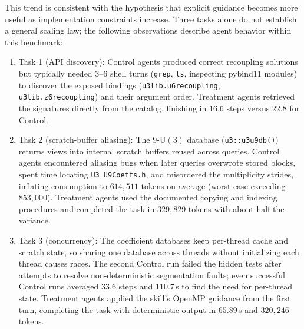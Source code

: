 \documentclass[aps,onecolumn,10pt,superscriptaddress,floatfix,nofootinbib]{revtex4}
\begin{document}
This trend is consistent with the hypothesis that explicit guidance becomes more useful as implementation constraints increase. Three tasks alone do not establish a general scaling law; the following observations describe agent behavior within this benchmark:
\begin{enumerate}
    \item {Task 1 (API discovery):} Control agents produced correct recoupling solutions but typically needed 3--6 shell turns (\texttt{grep}, \texttt{ls}, inspecting pybind11 modules) to discover the exposed bindings (\verb|u3lib.u6recoupling|, \verb|u3lib.z6recoupling|) and their argument order. Treatment agents retrieved the signatures directly from the catalog, finishing in $16.6$ steps versus $22.8$ for Control.
    \item {Task 2 (scratch-buffer aliasing):} The 9-$\mathrm{U}(3)$ database (\verb|u3::u3u9db()|) returns views into internal scratch buffers reused across queries. Control agents encountered aliasing bugs when later queries overwrote stored blocks, spent time locating \verb|U3_U9Coeffs.h|, and misordered the multiplicity strides, inflating consumption to $614,511$ tokens on average (worst case exceeding $853,000$). Treatment agents used the documented copying and indexing procedures and completed the task in $329,829$ tokens with about half the variance.
    \item {Task 3 (concurrency):} The coefficient databases keep per-thread cache and scratch state, so sharing one database across threads without initializing each thread causes races. The second Control run failed the hidden tests after attempts to resolve non-deterministic segmentation faults; even successful Control runs averaged $33.6$ steps and $110.7$\,s to find the need for per-thread state. Treatment agents applied the skill's OpenMP guidance from the first turn, completing the task with deterministic output in $65.89$\,s and $320,246$ tokens.
\end{enumerate}

\end{document}
